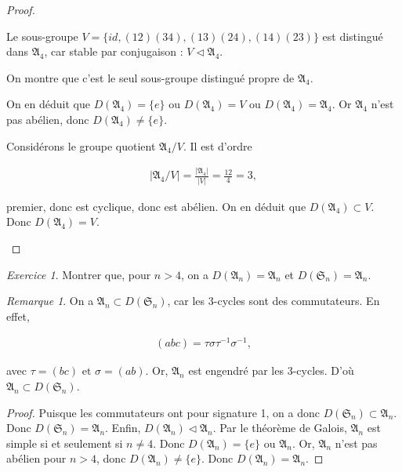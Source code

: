 \documentclass[french]{book}
\theoremstyle{definition}
\theoremstyle{remark}
\newtheorem*{remark}{Remarque}
\newtheorem{exo}{Exercice}
\newcommand{\biggg}{>}
\newcommand{\bg}{\biggg}
\begin{document}
\begin{proof}
\begin{enumerate}
    Le sous-groupe \(V = \{ id,  (1 2)(3 4), (1 3)(2 4), (1 4) (2 3)\}\) est distingué dans \(\mathfrak{A}_4\), car stable par conjugaison : \(V \triangleleft \mathfrak{A}_4\).

    On montre que c'est le seul sous-groupe distingué propre de \(\mathfrak{A}_4\).

    On en déduit que \(D(\mathfrak{A}_4) = \{ e \}\) ou \(D(\mathfrak{A}_4) = V\) ou \(D(\mathfrak{A}_4) = \mathfrak{A}_4\). Or \(\mathfrak{A}_4\) n'est pas abélien, donc \(D(\mathfrak{A}_4) \neq \{ e \}\).

    Considérons le groupe quotient \(\mathfrak{A}_4 / V\). Il est d'ordre

    \begin{gather*}
      \left\lvert \mathfrak{A}_4/V \right\rvert = \frac{\left\lvert \mathfrak{A}_4 \right\rvert}{\left\lvert V \right\rvert} = \frac{12}{4}= 3,
    \end{gather*}

    premier, donc est cyclique, donc est abélien. On en déduit que \(D(\mathfrak{A}_4) \subset V\). Donc \(D(\mathfrak{A}_4) = V\).
  \end{enumerate}
\end{proof}

\begin{exo}
  Montrer que, pour \(n \bg 4\), on a \(D(\mathfrak{A}_n) = \mathfrak{A}_n\) et \(D(\mathfrak{S}_n) = \mathfrak{A}_n\).
\end{exo}

\begin{remark}
  On a \(\mathfrak{A}_n \subset D(\mathfrak{S}_n)\), car les 3-cycles sont des commutateurs. En effet,

  \begin{gather*}
    (a b c) = \tau \sigma \tau ^{-1} \sigma ^{-1},
  \end{gather*}

  avec \(\tau = (bc) \text{ et } \sigma = (a b)\). Or, \(\mathfrak{A}_n\) est engendré par les 3-cycles. D'où \(\mathfrak{A}_n \subset D(\mathfrak{S}_n)\).
\end{remark}

\begin{proof}
  Puisque les commutateurs ont pour signature 1, on a donc \(D(\mathfrak{S}_{n}) \subset \mathfrak{A}_n\). Donc \(D(\mathfrak{S}_n) = \mathfrak{A}_n\). Enfin, \(D(\mathfrak{A}_n) \triangleleft \mathfrak{A}_n\). Par le théorème de Galois, \(\mathfrak{A}_n\) est simple si et seulement si \(n \neq 4\). Donc \(D(\mathfrak{A}_n) = \{ e \}\) ou \(\mathfrak{A}_n\). Or, \(\mathfrak{A}_n\) n'est pas abélien pour \(n \bg 4\), donc \(D(\mathfrak{A}_n) \neq \{ e \}\). Donc \(D(\mathfrak{A}_n) =\mathfrak{A}_n\).
\end{proof}
\end{document}

